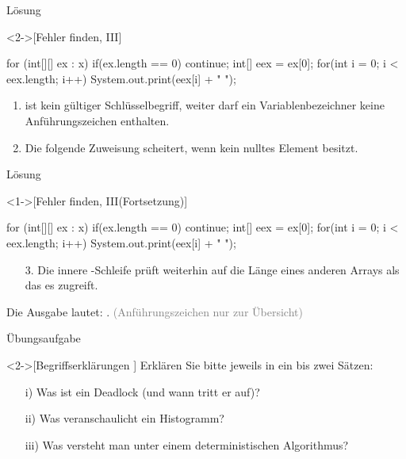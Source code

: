 \begin{frame}[c,fragile]{Lösung}
    \begin{solve}<2->[Fehler finden, III]
        \pause{}\begin{plainjava}
for (int[][] ex : x) {
    if(ex.length == 0) continue;
    int[] eex = ex[0];
    for(int i = 0; i < eex.length; i++)
        System.out.print(eex[i] + " ");
}
        \end{plainjava}
    \begin{enumerate}[<+(1)->]
        \item {} ist kein gültiger Schlüsselbegriff, weiter darf ein Variablen\-be\-zei\-chner keine Anführungszeichen enthalten.
        \item Die folgende Zuweisung scheitert, wenn  kein nulltes Element besitzt.
    \end{enumerate}
    \end{solve}
\end{frame}

\begin{frame}[c,fragile]{Lösung}
    \addtocounter{solve}{-1}
    \begin{solve}<1->[Fehler finden, III\hfill(Fortsetzung)]
        \begin{plainjava}
for (int[][] ex : x) {
    if(ex.length == 0) continue;
    int[] eex = ex[0];
    for(int i = 0; i < eex.length; i++)
        System.out.print(eex[i] + " ");
}
        \end{plainjava}
    \begin{enumerate}[<+(1)->]
        \item[3.] Die innere -Schleife prüft weiterhin auf die Länge eines anderen Arrays als das es zugreift.
    \end{enumerate}
    \pause{}Die Ausgabe lautet: . \textcolor{gray}{(Anführungszeichen nur zur Übersicht)}
    \end{solve}
\end{frame}


\begin{frame}[c]{Übungsaufgabe}
    \begin{exercise}<2->[Begriffserklärungen ]
        \pause{}Erklären Sie bitte jeweils in ein bis zwei Sätzen: \begin{enumerate}[<+(1)->]
            \item[i)] Was ist ein Deadlock (und wann tritt er auf)?
            \item[ii)] Was veranschaulicht ein Histogramm?
            \item[iii)] Was versteht man unter einem deterministischen Algorithmus?
        \end{enumerate}
    \end{exercise}
\end{frame}


